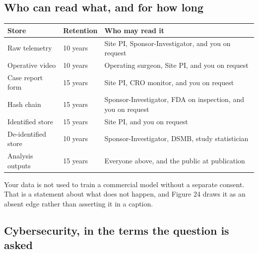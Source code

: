 
\subsection{Who can read what, and for how long}


\vspace{0.30em}

\noindent\begin{tabularx}{\textwidth}{L{3.5cm} C{1.7cm} Y}
\toprule
\textbf{Store} & \textbf{Retention} & \textbf{Who may read it} \\
\midrule
Raw telemetry & 10 years & Site PI, Sponsor-Investigator, and you on request \\
Operative video & 10 years & Operating surgeon, Site PI, and you on request \\
Case report form & 15 years & Site PI, CRO monitor, and you on request \\
Hash chain & 15 years & Sponsor-Investigator, FDA on inspection, and you on request \\
Identified store & 15 years & Site PI, and you on request \\
De-identified store & 10 years & Sponsor-Investigator, DSMB, study statistician \\
Analysis outputs & 15 years & Everyone above, and the public at publication \\
\bottomrule
\end{tabularx}

\vspace{0.30em}

\noindent Your data is not used to train a commercial model without a separate
consent. That is a statement about what does not happen, and Figure 24 draws it
as an absent edge rather than asserting it in a caption.

\subsection{Cybersecurity, in the terms the question is asked}

